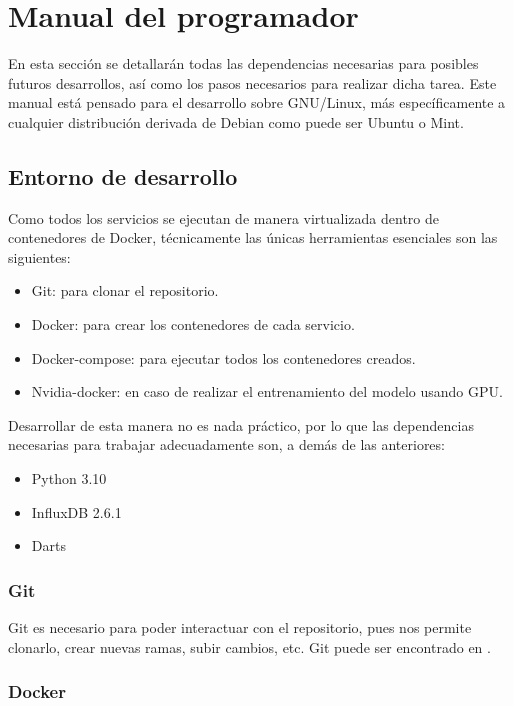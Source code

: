 \section{Manual del programador}

En esta sección se detallarán todas las dependencias necesarias para posibles futuros desarrollos, así como
los pasos necesarios para realizar dicha tarea. Este manual está pensado para el desarrollo sobre GNU/Linux,
más específicamente a cualquier distribución derivada de Debian como puede ser Ubuntu o Mint.

\subsection{Entorno de desarrollo}

Como todos los servicios se ejecutan de manera virtualizada dentro de contenedores de Docker, técnicamente las 
únicas herramientas esenciales son las siguientes:
\begin{itemize}
    \item Git: para clonar el repositorio.
    \item Docker: para crear los contenedores de cada servicio.
    \item Docker-compose: para ejecutar todos los contenedores creados.
    \item Nvidia-docker: en caso de realizar el entrenamiento del modelo usando GPU.
\end{itemize}

Desarrollar de esta manera no es nada práctico, por lo que las dependencias necesarias para trabajar adecuadamente son, 
a demás de las anteriores:
\begin{itemize}
    \item Python 3.10
    \item InfluxDB 2.6.1
    \item Darts
\end{itemize}

\subsubsection*{Git}

Git es necesario para poder interactuar con el repositorio, pues nos permite clonarlo, crear nuevas ramas,
subir cambios, etc. Git puede ser encontrado en \cite{git}.


\subsubsection*{Docker}

